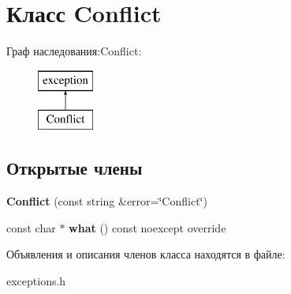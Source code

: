 \hypertarget{class_conflict}{}\section{Класс Conflict}
\label{class_conflict}
Граф наследования\+:Conflict\+:\begin{figure}[H]
\begin{center}
\leavevmode
\includegraphics[height=2.000000cm]{class_conflict}
\end{center}
\end{figure}
\subsection*{Открытые члены}
\begin{DoxyCompactItemize}
\item 
\mbox{\label{class_conflict_a185c6c0b89dcdf1305e3cbf1555aa84d}} 
{\bfseries Conflict} (const string \&error=\char`\"{}Conflict\char`\"{})
\item 
\mbox{\label{class_conflict_ac09f74685507fdb4a40a3a507c7d339a}} 
const char $\ast$ {\bfseries what} () const noexcept override
\end{DoxyCompactItemize}


Объявления и описания членов класса находятся в файле\+:\begin{DoxyCompactItemize}
\item 
exceptions.\+h\end{DoxyCompactItemize}
